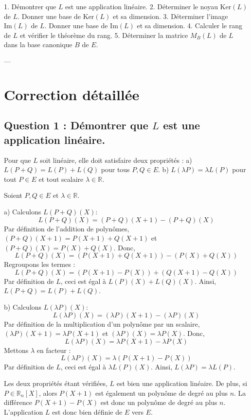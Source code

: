 \documentclass{report}
\begin{document}
1.  Démontrer que $L$ est une application linéaire.
2.  Déterminer le noyau $\mathrm{Ker}(L)$ de $L$. Donner une base de $\mathrm{Ker}(L)$ et sa dimension.
3.  Déterminer l'image $\mathrm{Im}(L)$ de $L$. Donner une base de $\mathrm{Im}(L)$ et sa dimension.
4.  Calculer le rang de $L$ et vérifier le théorème du rang.
5.  Déterminer la matrice $M_B(L)$ de $L$ dans la base canonique $B$ de $E$.

---

\section*{Correction détaillée}

\subsection*{Question 1 : Démontrer que $L$ est une application linéaire.}

Pour que $L$ soit linéaire, elle doit satisfaire deux propriétés :
a) $L(P+Q) = L(P) + L(Q)$ pour tous $P, Q \in E$.
b) $L(\lambda P) = \lambda L(P)$ pour tout $P \in E$ et tout scalaire $\lambda \in \mathbb{R}$.

Soient $P, Q \in E$ et $\lambda \in \mathbb{R}$.

a) Calculons $L(P+Q)(X)$:
$$L(P+Q)(X) = (P+Q)(X+1) - (P+Q)(X)$$
Par définition de l'addition de polynômes, $(P+Q)(X+1) = P(X+1) + Q(X+1)$ et $(P+Q)(X) = P(X) + Q(X)$.
Donc,
$$L(P+Q)(X) = (P(X+1) + Q(X+1)) - (P(X) + Q(X))$$
Regroupons les termes :
$$L(P+Q)(X) = (P(X+1) - P(X)) + (Q(X+1) - Q(X))$$
Par définition de $L$, ceci est égal à $L(P)(X) + L(Q)(X)$.
Ainsi, $L(P+Q) = L(P) + L(Q)$.

b) Calculons $L(\lambda P)(X)$:
$$L(\lambda P)(X) = (\lambda P)(X+1) - (\lambda P)(X)$$
Par définition de la multiplication d'un polynôme par un scalaire, $(\lambda P)(X+1) = \lambda P(X+1)$ et $(\lambda P)(X) = \lambda P(X)$.
Donc,
$$L(\lambda P)(X) = \lambda P(X+1) - \lambda P(X)$$
Mettons $\lambda$ en facteur :
$$L(\lambda P)(X) = \lambda (P(X+1) - P(X))$$
Par définition de $L$, ceci est égal à $\lambda L(P)(X)$.
Ainsi, $L(\lambda P) = \lambda L(P)$.

Les deux propriétés étant vérifiées, $L$ est bien une application linéaire.
De plus, si $P \in \mathbb{R}_n[X]$, alors $P(X+1)$ est également un polynôme de degré au plus $n$. La différence $P(X+1)-P(X)$ est donc un polynôme de degré au plus $n$. L'application $L$ est donc bien définie de $E$ vers $E$.
\end{document}
